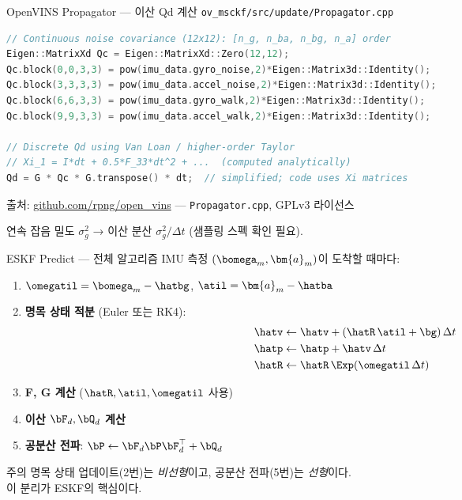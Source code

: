 \begin{frame}[fragile]{OpenVINS Propagator — 이산 Qd 계산}
  \texttt{ov\_msckf/src/update/Propagator.cpp}
\begin{lstlisting}[language=C++, basicstyle=\ttfamily\tiny]
// Continuous noise covariance (12x12): [n_g, n_ba, n_bg, n_a] order
Eigen::MatrixXd Qc = Eigen::MatrixXd::Zero(12,12);
Qc.block(0,0,3,3) = pow(imu_data.gyro_noise,2)*Eigen::Matrix3d::Identity();
Qc.block(3,3,3,3) = pow(imu_data.accel_noise,2)*Eigen::Matrix3d::Identity();
Qc.block(6,6,3,3) = pow(imu_data.gyro_walk,2)*Eigen::Matrix3d::Identity();
Qc.block(9,9,3,3) = pow(imu_data.accel_walk,2)*Eigen::Matrix3d::Identity();

// Discrete Qd using Van Loan / higher-order Taylor
// Xi_1 = I*dt + 0.5*F_33*dt^2 + ...  (computed analytically)
Qd = G * Qc * G.transpose() * dt;  // simplified; code uses Xi matrices
\end{lstlisting}
  \vspace{0.2em}
  {\footnotesize 출처: \url{github.com/rpng/open_vins} — \texttt{Propagator.cpp}, GPLv3 라이선스}

  \vspace{0.2em}
  연속 잡음 밀도 $\sigma_g^2$ → 이산 분산 $\sigma_g^2/\Delta t$ (샘플링 스펙 확인 필요).
\end{frame}

\begin{frame}[shrink=10]{ESKF Predict — 전체 알고리즘}
  IMU 측정 $(\bomega_m, \bm{a}_m)$이 도착할 때마다:
  \begin{enumerate}
    \item $\omegatil = \bomega_m - \hatbg$, \;$\atil = \bm{a}_m - \hatba$
    \item \textbf{명목 상태 적분} (Euler 또는 RK4):
      \begin{align*}
        \hatv &\leftarrow \hatv + (\hatR\,\atil + \bg)\,\Delta t \\
        \hatp &\leftarrow \hatp + \hatv\,\Delta t \\
        \hatR &\leftarrow \hatR\,\Exp(\omegatil\,\Delta t)
      \end{align*}
    \item \textbf{F, G 계산} ($\hatR, \atil, \omegatil$ 사용)
    \item \textbf{이산 $\bF_d, \bQ_d$ 계산}
    \item \textbf{공분산 전파}: $\bP \leftarrow \bF_d\bP\bF_d^\top + \bQ_d$
  \end{enumerate}
  \pause
  \begin{alertblock}{주의}
    명목 상태 업데이트(2번)는 \emph{비선형}이고, 공분산 전파(5번)는 \emph{선형}이다. \\
    이 분리가 ESKF의 핵심이다.
  \end{alertblock}
\end{frame}

